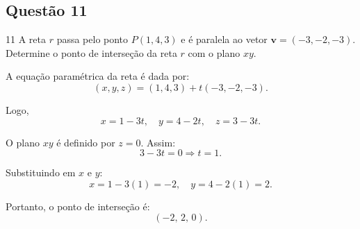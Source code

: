 \subsection*{Questão 11}

\begin{questionbox}{11}
  A reta $r$ passa pelo ponto $P(1,4,3)$ e é paralela ao vetor $\mathbf{v} = (-3,-2,-3)$. Determine o ponto de interseção da reta $r$ com o plano $xy$.
\end{questionbox}

\newpage

\begin{solutionbox}
  A equação paramétrica da reta é dada por:
  \[
  (x,y,z) = (1,4,3) + t(-3,-2,-3).
  \]

  Logo,
  \[
  x = 1 - 3t,\quad y = 4 - 2t,\quad z = 3 - 3t.
  \]

  O plano $xy$ é definido por $z = 0$. Assim:
  \[
  3 - 3t = 0 \Rightarrow t = 1.
  \]

  Substituindo em $x$ e $y$:
  \[
  x = 1 - 3(1) = -2,\quad y = 4 - 2(1) = 2.
  \]
  \end{solutionbox}

  \begin{solutionbox}
  Portanto, o ponto de interseção é:
  \[
  \boxed{(-2,\,2,\,0)}.
  \]
\end{solutionbox}